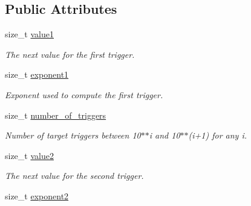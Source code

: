 \subsection*{Public Attributes}
\begin{DoxyCompactItemize}
\item 
size\+\_\+t \hyperlink{structcoco__observer__evaluations__t_a9582e7e638c6bbf6375feaad790bee94}{value1}\hypertarget{structcoco__observer__evaluations__t_a9582e7e638c6bbf6375feaad790bee94}{}\label{structcoco__observer__evaluations__t_a9582e7e638c6bbf6375feaad790bee94}

\begin{DoxyCompactList}\small\item\em The next value for the first trigger. \end{DoxyCompactList}\item 
size\+\_\+t \hyperlink{structcoco__observer__evaluations__t_afb8689351378690fd392da14127b408c}{exponent1}\hypertarget{structcoco__observer__evaluations__t_afb8689351378690fd392da14127b408c}{}\label{structcoco__observer__evaluations__t_afb8689351378690fd392da14127b408c}

\begin{DoxyCompactList}\small\item\em Exponent used to compute the first trigger. \end{DoxyCompactList}\item 
size\+\_\+t \hyperlink{structcoco__observer__evaluations__t_a9f58c511563d2f2f802e6a09b3de8161}{number\+\_\+of\+\_\+triggers}\hypertarget{structcoco__observer__evaluations__t_a9f58c511563d2f2f802e6a09b3de8161}{}\label{structcoco__observer__evaluations__t_a9f58c511563d2f2f802e6a09b3de8161}

\begin{DoxyCompactList}\small\item\em Number of target triggers between 10$\ast$$\ast$i and 10$\ast$$\ast$(i+1) for any i. \end{DoxyCompactList}\item 
size\+\_\+t \hyperlink{structcoco__observer__evaluations__t_a718f500df0c6db9e576f4287bcaeb5c9}{value2}\hypertarget{structcoco__observer__evaluations__t_a718f500df0c6db9e576f4287bcaeb5c9}{}\label{structcoco__observer__evaluations__t_a718f500df0c6db9e576f4287bcaeb5c9}

\begin{DoxyCompactList}\small\item\em The next value for the second trigger. \end{DoxyCompactList}\item 
size\+\_\+t \hyperlink{structcoco__observer__evaluations__t_a98cd613eb45762debda22da8065209f6}{exponent2}\hypertarget{structcoco__observer__evaluations__t_a98cd613eb45762debda22da8065209f6}{}\label{structcoco__observer__evaluations__t_a98cd613eb45762debda22da8065209f6}


\end{DoxyCompactItemize}
